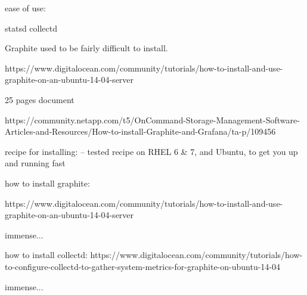 ease of use: 


statsd
collectd



Graphite used to be fairly difficult to install. 

https://www.digitalocean.com/community/tutorials/how-to-install-and-use-graphite-on-an-ubuntu-14-04-server




25 pages document

https://community.netapp.com/t5/OnCommand-Storage-Management-Software-Articles-and-Resources/How-to-install-Graphite-and-Grafana/ta-p/109456

recipe for installing: 
-- tested recipe on RHEL 6 & 7, and Ubuntu, to get you up and running fast


how to install graphite:

https://www.digitalocean.com/community/tutorials/how-to-install-and-use-graphite-on-an-ubuntu-14-04-server

immense...


how to install collectd: 
https://www.digitalocean.com/community/tutorials/how-to-configure-collectd-to-gather-system-metrics-for-graphite-on-ubuntu-14-04

immense...


